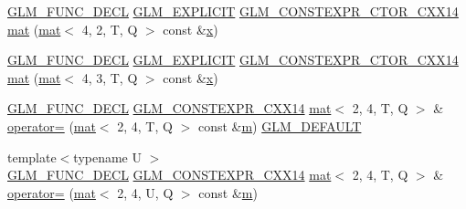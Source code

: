 \begin{DoxyCompactItemize}
\mbox{\hyperlink{setup_8hpp_ab2d052de21a70539923e9bcbf6e83a51}{G\+L\+M\+\_\+\+F\+U\+N\+C\+\_\+\+D\+E\+CL}} \mbox{\hyperlink{setup_8hpp_a6c74f5a5e7b134ab69023ff9a30d4d5d}{G\+L\+M\+\_\+\+E\+X\+P\+L\+I\+C\+IT}} \mbox{\hyperlink{setup_8hpp_a0900f9145e68bf6061b6f5e7be3fa751}{G\+L\+M\+\_\+\+C\+O\+N\+S\+T\+E\+X\+P\+R\+\_\+\+C\+T\+O\+R\+\_\+\+C\+X\+X14}} \mbox{\hyperlink{structglm_1_1mat_3_012_00_014_00_01_t_00_01_q_01_4_aecf5df0e023b0cd4d0f6f0e6ac9f9d3f}{mat}} (\mbox{\hyperlink{structglm_1_1mat}{mat}}$<$ 4, 2, T, Q $>$ const \&\mbox{\hyperlink{_s_d_l__opengl_8h_ad0e63d0edcdbd3d79554076bf309fd47}{x}})
\item 
\mbox{\hyperlink{setup_8hpp_ab2d052de21a70539923e9bcbf6e83a51}{G\+L\+M\+\_\+\+F\+U\+N\+C\+\_\+\+D\+E\+CL}} \mbox{\hyperlink{setup_8hpp_a6c74f5a5e7b134ab69023ff9a30d4d5d}{G\+L\+M\+\_\+\+E\+X\+P\+L\+I\+C\+IT}} \mbox{\hyperlink{setup_8hpp_a0900f9145e68bf6061b6f5e7be3fa751}{G\+L\+M\+\_\+\+C\+O\+N\+S\+T\+E\+X\+P\+R\+\_\+\+C\+T\+O\+R\+\_\+\+C\+X\+X14}} \mbox{\hyperlink{structglm_1_1mat_3_012_00_014_00_01_t_00_01_q_01_4_addaf64b8bf06e6485613afe876a4f4ac}{mat}} (\mbox{\hyperlink{structglm_1_1mat}{mat}}$<$ 4, 3, T, Q $>$ const \&\mbox{\hyperlink{_s_d_l__opengl_8h_ad0e63d0edcdbd3d79554076bf309fd47}{x}})
\item 
\mbox{\hyperlink{setup_8hpp_ab2d052de21a70539923e9bcbf6e83a51}{G\+L\+M\+\_\+\+F\+U\+N\+C\+\_\+\+D\+E\+CL}} \mbox{\hyperlink{setup_8hpp_a4dd12abf5e1164bc57f3a34671d03844}{G\+L\+M\+\_\+\+C\+O\+N\+S\+T\+E\+X\+P\+R\+\_\+\+C\+X\+X14}} \mbox{\hyperlink{structglm_1_1mat}{mat}}$<$ 2, 4, T, Q $>$ \& \mbox{\hyperlink{structglm_1_1mat_3_012_00_014_00_01_t_00_01_q_01_4_a3616702a1f09e39ffcd49032a89432c7}{operator=}} (\mbox{\hyperlink{structglm_1_1mat}{mat}}$<$ 2, 4, T, Q $>$ const \&\mbox{\hyperlink{_s_d_l__opengl__glext_8h_af593500c283bf1a787a6f947f503a5c2}{m}}) \mbox{\hyperlink{setup_8hpp_aefce7051c376a64ba89fa93a9f63bc2c}{G\+L\+M\+\_\+\+D\+E\+F\+A\+U\+LT}}
\item 
{\footnotesize template$<$typename U $>$ }\\\mbox{\hyperlink{setup_8hpp_ab2d052de21a70539923e9bcbf6e83a51}{G\+L\+M\+\_\+\+F\+U\+N\+C\+\_\+\+D\+E\+CL}} \mbox{\hyperlink{setup_8hpp_a4dd12abf5e1164bc57f3a34671d03844}{G\+L\+M\+\_\+\+C\+O\+N\+S\+T\+E\+X\+P\+R\+\_\+\+C\+X\+X14}} \mbox{\hyperlink{structglm_1_1mat}{mat}}$<$ 2, 4, T, Q $>$ \& \mbox{\hyperlink{structglm_1_1mat_3_012_00_014_00_01_t_00_01_q_01_4_ae87ff600b214915268b087c314e3cdf8}{operator=}} (\mbox{\hyperlink{structglm_1_1mat}{mat}}$<$ 2, 4, U, Q $>$ const \&\mbox{\hyperlink{_s_d_l__opengl__glext_8h_af593500c283bf1a787a6f947f503a5c2}{m}})

\end{DoxyCompactItemize}
